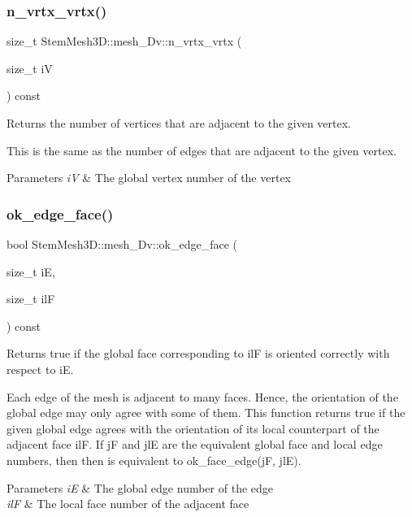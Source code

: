 \subsubsection{\texorpdfstring{n\+\_\+vrtx\+\_\+vrtx()}{n\_vrtx\_vrtx()}}
{\footnotesize\ttfamily size\+\_\+t Stem\+Mesh3\+D\+::mesh\+\_\+Dv\+::n\+\_\+vrtx\+\_\+vrtx (\begin{DoxyParamCaption}\item[{size\+\_\+t}]{iV }\end{DoxyParamCaption}) const}



Returns the number of vertices that are adjacent to the given vertex. 

This is the same as the number of edges that are adjacent to the given vertex. 
\begin{DoxyParams}{Parameters}
{\em iV} & The global vertex number of the vertex \\
\hline
\end{DoxyParams}
\mbox{\label{classStemMesh3D_1_1mesh__3Dv_a0864ac0c5e4a946ff620caf60ba2526e}} 
\subsubsection{\texorpdfstring{ok\+\_\+edge\+\_\+face()}{ok\_edge\_face()}}
{\footnotesize\ttfamily bool Stem\+Mesh3\+D\+::mesh\+\_\+Dv\+::ok\+\_\+edge\+\_\+face (\begin{DoxyParamCaption}\item[{size\+\_\+t}]{iE,  }\item[{size\+\_\+t}]{ilF }\end{DoxyParamCaption}) const}



Returns true if the global face corresponding to ilF is oriented correctly with respect to iE. 

Each edge of the mesh is adjacent to many faces. Hence, the orientation of the global edge may only agree with some of them. This function returns true if the given global edge agrees with the orientation of its local counterpart of the adjacent face ilF. If jF and jlE are the equivalent global face and local edge numbers, then then is equivalent to ok\+\_\+face\+\_\+edge(j\+F, jl\+E). 
\begin{DoxyParams}{Parameters}
{\em iE} & The global edge number of the edge \\
\hline
{\em ilF} & The local face number of the adjacent face \\
\hline
\end{DoxyParams}
\mbox{\label{classStemMesh3D_1_1mesh__3Dv_af49e94aea3119432fadf9878cafba5c5}} 
